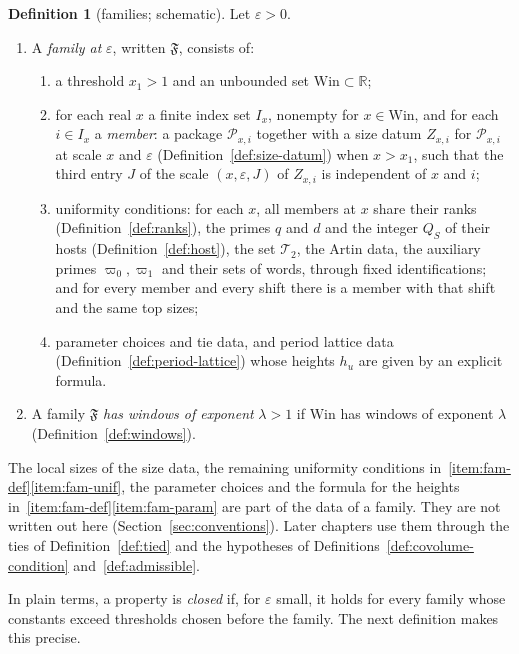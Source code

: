 \documentclass[11pt]{amsbook}
\theoremstyle{plain}
\theoremstyle{definition}
\newtheorem{definition}[theorem]{Definition}
\theoremstyle{remark}
\numberwithin{equation}{section}
\numberwithin{figure}{chapter}
\numberwithin{table}{chapter}
\newcommand{\R}{\mathbb{R}}
\newcommand{\eps}{\varepsilon}
\newcommand{\Top}{\mathcal{T}}
\newcommand{\Fam}{\mathfrak{F}}
\newcommand{\Win}{\mathrm{Win}}
\begin{document}
\begin{definition}[families; schematic]\label{def:family}
Let $\eps>0$.
\begin{enumerate}[label=(\arabic*)]
\item\label{item:fam-def}
A \emph{family at} $\eps$, written $\Fam$, consists of:
\begin{enumerate}[label=(\alph*)]
\item a threshold $x_1>1$ and an unbounded set $\Win\subset\R$;
\item for each real $x$ a finite index set $I_x$, nonempty for
$x\in\Win$, and for each $i\in I_x$ a \emph{member}: a package
$\mathcal P_{x,i}$ together with a size datum $Z_{x,i}$ for
$\mathcal P_{x,i}$ at scale $x$ and $\eps$
(Definition~\ref{def:size-datum}) when $x>x_1$, such that the
third entry $J$ of the scale $(x,\eps,J)$ of $Z_{x,i}$ is independent
of $x$ and $i$;
\item\label{item:fam-unif}
uniformity conditions: for each $x$, all members at $x$ share
their ranks (Definition~\ref{def:ranks}), the primes $q$ and $d$ and
the integer $Q_S$ of their hosts (Definition~\ref{def:host}), the set
$\Top_2$, the Artin data, the auxiliary primes $\varpi_0,\varpi_1$ and
their sets of words, through fixed identifications; and for every
member and every shift there is a member with that shift and the same
top sizes;
\item\label{item:fam-param}
parameter choices and tie data, and period lattice data
(Definition~\ref{def:period-lattice}) whose heights $h_u$ are given by
an explicit formula.
\end{enumerate}
\item A family $\Fam$ \emph{has windows of exponent} $\lambda>1$ if
$\Win$ has windows of exponent $\lambda$
(Definition~\ref{def:windows}).
\end{enumerate}
\end{definition}
\noindent The local sizes of the size data, the remaining uniformity
conditions in~\ref{item:fam-def}\ref{item:fam-unif}, the parameter choices and
the formula for the
heights in~\ref{item:fam-def}\ref{item:fam-param} are part of the data of a
family. They are not written out
here (Section~\ref{sec:conventions}). Later chapters use them
through the ties of
Definition~\ref{def:tied} and the hypotheses of
Definitions~\ref{def:covolume-condition} and~\ref{def:admissible}.

In plain terms, a property is \emph{closed} if, for $\eps$ small, it
holds for every family whose constants exceed thresholds chosen before
the family. The next definition makes this precise.
\end{document}
